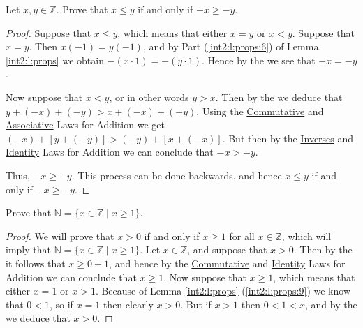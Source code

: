 \Newpage
\begin{exercise} %
	\label{int2:e:3}
	Let $x, y \in \mathbb{Z}$. Prove that $x \leq y$ if and only if $-x \geq -y$.
\end{exercise}

\begin{proof}
	Suppose that $x \leq y$, which means that either $x = y$ or $x < y$. Suppose that $x = y$. Then $x(-1) = y(-1)$, and by Part (\ref{int2:l:props:6}) of Lemma \ref{int2:l:props} we obtain
	$-(x \cdot 1) = -(y \cdot 1)$. Hence by the  we see that $-x = -y$.

	Now suppose that $x < y$, or in other words $y > x$. Then by the  we deduce that $y + (-x) + (-y) > x + (-x) + (-y)$. Using the \hyperref[int2:d:oid:commutative_add]{Commutative} and \hyperref[int2:d:oid:associative_add]{Associative} Laws for Addition we get $(-x) + [y + (-y)] > (-y) + [x + (-x)]$. But then by the \hyperref[int2:d:oid:inverses_add]{Inverses} and \hyperref[int2:d:oid:identity_add]{Identity} Laws for Addition we can conclude that $-x > -y$.

	Thus, $-x \geq -y$. This process can be done backwards, and hence $x \leq y$ if and only if $-x \geq -y$.
\end{proof}


\Newpage
\begin{exercise} %
	\label{int2:e:4}
	Prove that $\mathbb{N} = \{ x \in \mathbb{Z} \mid x \geq 1 \}$.
\end{exercise}

\begin{proof}
	We will prove that $x > 0$ if and only if $x \geq 1$ for all $x \in \mathbb{Z}$, which will imply that $\mathbb{N} = \{ x \in \mathbb{Z} \mid x \geq 1 \}$. Let $x \in \mathbb{Z}$, and suppose that $x > 0$. Then by the  it follows that $x \geq 0 + 1$, and hence by the \hyperref[int2:d:oid:commutative_add]{Commutative} and \hyperref[int2:d:oid:identity_add]{Identity} Laws for Addition we can conclude that $x \geq 1$. Now suppose that $x \geq 1$, which means that either $x = 1$ or $x > 1$. Because of Lemma \ref{int2:l:props} (\ref{int2:l:props:9}) we know that $0 < 1$, so if $x = 1$ then clearly $x > 0$. But if $x > 1$ then $0 < 1 < x$, and by the  we deduce that $x > 0$.

\end{proof}


